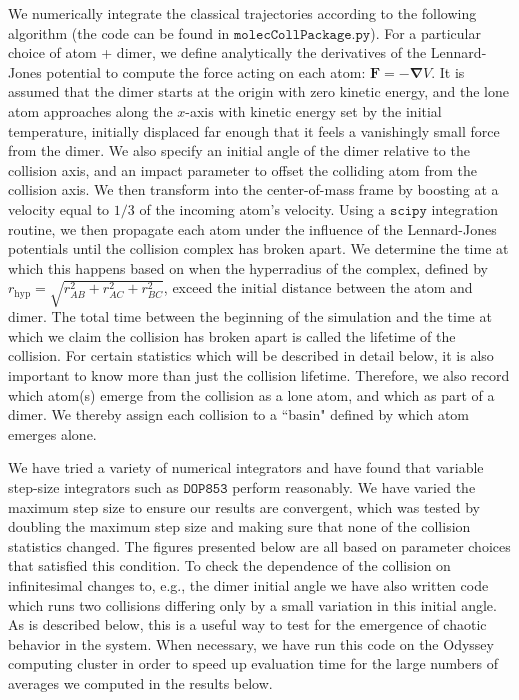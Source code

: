 \documentclass[%
 reprint,
 amsmath,amssymb,
 aps,
 nofootinbib
]{revtex4-1}
\begin{document}
 We numerically integrate the classical trajectories according to the following algorithm (the code can be found in $\texttt{molecCollPackage.py}$). For a particular choice of atom + dimer, we define analytically the derivatives of the Lennard-Jones potential to compute the force acting on each atom: $\mathbf{F} = -\mathbf{\nabla}V$. It is assumed that the dimer starts at the origin with zero kinetic energy, and the lone atom approaches along the $x$-axis with kinetic energy set by the initial temperature, initially displaced far enough that it feels a vanishingly small force from the dimer. We also specify an initial angle of the dimer relative to the collision axis, and an impact parameter to offset the colliding atom from the collision axis. We then transform into the center-of-mass frame by boosting at a velocity equal to $1/3$ of the incoming atom's velocity. Using a $\texttt{scipy}$ integration routine, we then propagate each atom under the influence of the Lennard-Jones potentials until the collision complex has broken apart. We determine the time at which this happens based on when the hyperradius of the complex, defined by $r_\text{hyp} = \sqrt{r_{AB}^2 + r_{AC}^2 + r_{BC}^2}$, exceed the initial distance between the atom and dimer. The total time between the beginning of the simulation and the time at which we claim the collision has broken apart is called the lifetime of the collision. For certain statistics which will be described in detail below, it is also important to know more than just the collision lifetime. Therefore, we also record which atom(s) emerge from the collision as a lone atom, and which as part of a dimer. We thereby assign each collision to a ``basin" defined by which atom emerges alone.

We have tried a variety of numerical integrators and have found that variable step-size integrators such as $\texttt{DOP853}$ perform reasonably. We have varied the maximum step size to ensure our results are convergent, which was tested by doubling the maximum step size and making sure that none of the collision statistics changed. The figures presented below are all based on parameter choices that satisfied this condition. To check the dependence of the collision on infinitesimal changes to, e.g., the dimer initial angle we have also written code which runs two collisions differing only by a small variation in this initial angle. As is described below, this is a useful way to test for the emergence of chaotic behavior in the system. When necessary, we have run this code on the Odyssey computing cluster in order to speed up evaluation time for the large numbers of averages we computed in the results below.
\end{document}
